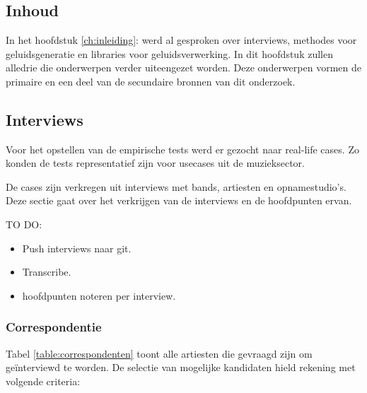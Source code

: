 \chapter{}
\label{ch:stand-van-zaken}



\section{Inhoud}

In het hoofdstuk \ref{ch:inleiding}:  werd al gesproken over interviews, methodes voor geluidsgeneratie en libraries voor geluidsverwerking. In dit hoofdstuk zullen alledrie die onderwerpen verder uiteengezet worden. Deze onderwerpen vormen de primaire en een deel van de secundaire bronnen van dit onderzoek.

\section{Interviews}

Voor het opstellen van de empirische tests werd er gezocht naar real-life cases. Zo konden de tests representatief zijn voor usecases uit de muzieksector.

De cases zijn verkregen uit interviews met bands, artiesten en opnamestudio's. Deze sectie gaat over het verkrijgen van de interviews en de hoofdpunten ervan.

TO DO:
\begin{itemize}
    \item Push interviews naar git.
    \item Transcribe.
    \item hoofdpunten noteren per interview.
\end{itemize}{}

\subsection{Correspondentie}

Tabel \ref{table:correspondenten} toont alle artiesten die gevraagd zijn om geïnterviewd te worden. De selectie van mogelijke kandidaten hield rekening met volgende criteria:

